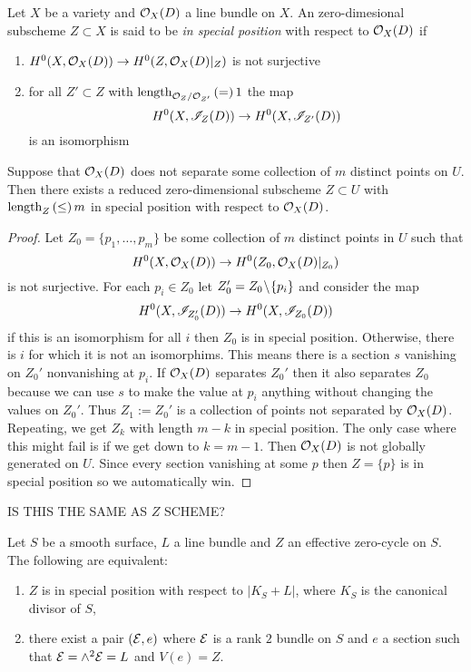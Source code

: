 \documentclass[12pt]{article}
\begin{document}
\begin{defn}
Let $X$ be a variety and $\mathcal{O}_{X}(D)$ a line bundle on $X$. An zero-dimesional subscheme $Z \subset X$ is said to be \textit{in special position} with respect to $\mathcal{O}_{X}(D)$ if 
\begin{enumerate}
\item $H^0(X, \mathcal{O}_{X}(D)) \to H^0(Z, \mathcal{O}_{X}(D)|_Z)$ is not surjective
\item for all $Z' \subset Z$ with $\mathrm{length}_{\mathcal{O}_{Z} / \mathcal{O}_{Z'}}\left( = \right) 1$ the map
\[ H^0(X, \mathscr{I}_{Z}(D)) \to H^0(X, \mathscr{I}_{Z'}(D)) \]
is an isomorphism
\end{enumerate}
\end{defn}

\begin{lemma}
Suppose that $\mathcal{O}_{X}(D)$ does not separate some collection of $m$ distinct points on $U$. Then there exists a reduced zero-dimensional subscheme $Z \subset U$ with $\mathrm{length}_{Z}\left( \le \right) m$ in special position with respect to $\mathcal{O}_{X}(D)$.
\end{lemma}

\begin{proof}
Let $Z_0 = \{ p_1, \dots, p_m \}$ be some collection of $m$ distinct points in $U$ such that
\[ H^0(X, \mathcal{O}_{X}(D)) \to H^0(Z_0, \mathcal{O}_{X}(D)|_{Z_0}) \]
is not surjective. For each $p_i \in Z_0$ let $Z_0' = Z_0 \! \setminus \! \{ p_i \}$ and consider the map
\[ H^0(X, \mathscr{I}_{Z_0'}(D)) \to H^0(X, \mathscr{I}_{Z_0}(D)) \]
if this is an isomorphism for all $i$ then $Z_0$ is in special position. Otherwise, there is $i$ for which it is not an isomorphims. This means there is a section $s$ vanishing on $Z_0'$ nonvanishing at $p_i$. If $\mathcal{O}_{X}(D)$ separates $Z_0'$ then it also separates $Z_0$ because we can use $s$ to make the value at $p_i$ anything without changing the values on $Z_0'$. Thus $Z_1 := Z_0'$ is a collection of points not separated by $\mathcal{O}_{X}(D)$. Repeating, we get $Z_k$ with length $m - k$ in special position. The only case where this might fail is if we get down to $k = m - 1$. Then $\mathcal{O}_{X}(D)$ is not globally generated on $U$. Since every section vanishing at some $p$ then $Z = \{ p \}$ is in special position so we automatically win.  
\end{proof}

{\color{red} IS THIS THE SAME AS $Z$ SCHEME?}

\begin{theorem}
Let $S$ be a smooth surface, $L$ a line bundle and $Z$ an effective zero-cycle on $S$. The following are equivalent:
\begin{enumerate}
\item $Z$ is in special position with respect to $|K_S + L|$, where $K_S$ is the canonical divisor of $S$,
\item there exist a pair $(\mathcal{E}, e)$ where $\mathcal{E}$ is a rank $2$ bundle on $S$ and $e$ a section such that $\mathcal{E} = \wedge^2 \mathcal{E} = L$ and $V(e) = Z$.
\end{enumerate}
\end{theorem}
\end{document}
